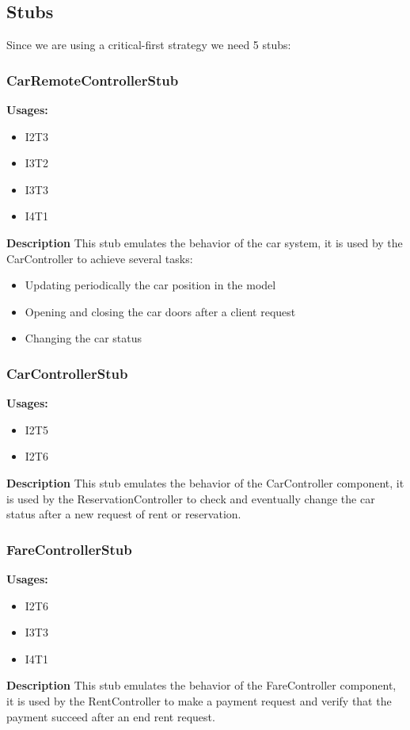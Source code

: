 \subsection{Stubs}
Since we are using a critical-first strategy we need  5 stubs:

\subsubsection{CarRemoteControllerStub}
\textbf{Usages:}
\begin{itemize}
\item I2T3
\item I3T2
\item I3T3
\item I4T1
\end{itemize}

\textbf{Description}
This stub emulates the behavior of the car system, it is used by the CarController to achieve several tasks:
\begin{itemize}
\item Updating periodically the car position in the model
\item Opening and closing the car doors after a client request
\item Changing the car status
\end{itemize}

\subsubsection{CarControllerStub}
\textbf{Usages:}
\begin{itemize}
\item I2T5
\item I2T6
\end{itemize}

\textbf{Description}
This stub emulates the behavior of the CarController component, it is used by the ReservationController  to check and eventually change the car status after a new request of rent or reservation.

\subsubsection{FareControllerStub}
\textbf{Usages:}
\begin{itemize}
\item I2T6
\item I3T3
\item I4T1
\end{itemize}
\textbf{Description}
This stub emulates the behavior of the FareController component, it is used by the RentController to  make a payment request and verify that the payment succeed after an end rent request.

